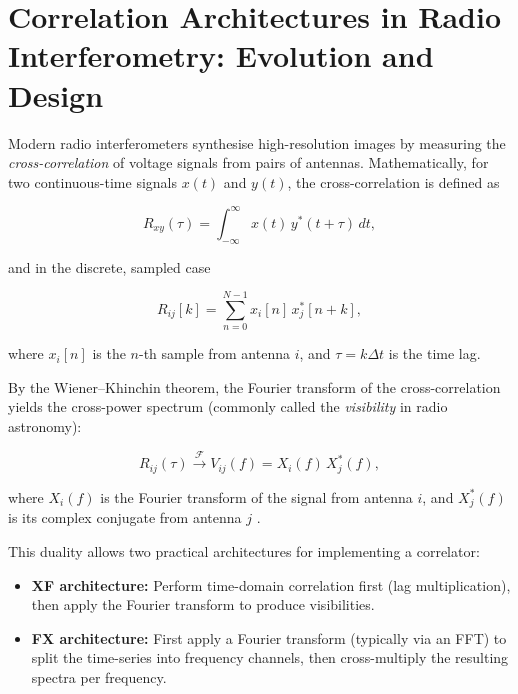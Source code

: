 \section{Correlation Architectures in Radio Interferometry: Evolution and Design}
Modern radio interferometers synthesise high-resolution images by measuring the \textit{cross-correlation} of voltage signals from pairs of antennas. Mathematically, for two continuous-time signals \( x(t) \) and \( y(t) \), the cross-correlation is defined as

\begin{equation}
    R_{xy}(\tau) = \int_{-\infty}^{\infty} x(t)\,y^*(t+\tau)\,dt,
\end{equation}

and in the discrete, sampled case

\begin{equation}
    R_{ij}[k] = \sum_{n=0}^{N-1} x_i[n]\,x_j^*[n+k],
\end{equation}

where \( x_i[n] \) is the \( n \)-th sample from antenna \( i \), and \( \tau = k\Delta t \) is the time lag.

By the Wiener–Khinchin theorem, the Fourier transform of the cross-correlation yields the cross-power spectrum (commonly called the \emph{visibility} in radio astronomy):

\begin{equation}
    R_{ij}(\tau) \xrightarrow{\ \mathcal{F}\ } V_{ij}(f) = X_i(f)\,X_j^*(f),
\end{equation}

where \( X_i(f) \) is the Fourier transform of the signal from antenna \( i \), and \( X_j^*(f) \) is its complex conjugate from antenna \( j \) \cite{Thompson2001, Escoffier2007}.

This duality allows two practical architectures for implementing a correlator:

\begin{itemize}
    \item \textbf{XF architecture:} Perform time-domain correlation first (lag multiplication), then apply the Fourier transform to produce visibilities.
    
    \item \textbf{FX architecture:} First apply a Fourier transform (typically via an FFT) to split the time-series into frequency channels, then cross-multiply the resulting spectra per frequency.
\end{itemize}

